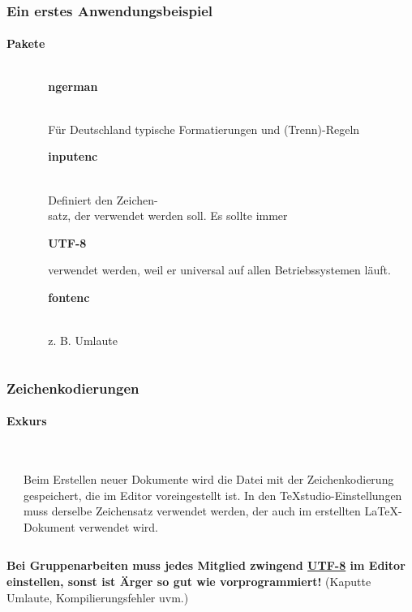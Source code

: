 \begin{frame}
\frametitle{Ein erstes Anwendungsbeispiel}
\framesubtitle{Pakete}
\begin{columns}
\begin{column}{0.55\textwidth}
\begin{ttfamily}\footnotesize

 \normalsize
\end{ttfamily}
\end{column}
\begin{column}{0.45\textwidth}
\begin{ttfamily}\textbf{ngerman}\end{ttfamily}\\
Für Deutschland typische Formatierungen und (Trenn)-Regeln\\[5mm]

\begin{ttfamily}\textbf{inputenc}\end{ttfamily}\\
Definiert den Zeichen-\\satz, der verwendet werden soll. Es sollte immer
\begin{ttfamily}\textbf{UTF-8}\end{ttfamily} verwendet werden, weil er universal auf
allen Betriebssystemen läuft.\\[5mm]

\begin{ttfamily}\textbf{fontenc}\end{ttfamily}\\
z. B. Umlaute\\
\end{column}
\end{columns}
\end{frame}


\begin{frame}
\frametitle{Zeichenkodierungen}
\framesubtitle{Exkurs}
\begin{columns}
\begin{column}{0.6\textwidth}

\end{column}
\begin{column}{0.4\textwidth}
\vspace*{2pt}\\
Beim Erstellen neuer Dokumente wird die Datei mit der Zeichenkodierung gespeichert, die im
 Editor voreingestellt ist. In den TeXstudio-Einstellungen muss derselbe Zeichensatz verwendet werden, der
auch im erstellten \LaTeX-Dokument verwendet wird.
\end{column}
\end{columns}
\vspace*{4pt}
\textbf{Bei Gruppenarbeiten muss jedes Mitglied zwingend \underline{UTF-8} im
Editor einstellen, sonst ist Ärger so gut wie vorprogrammiert!} (Kaputte
Umlaute, Kompilierungsfehler uvm.)
\end{frame}

